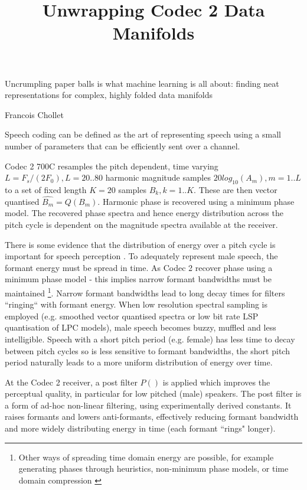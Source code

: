 \documentclass{article}
\begin{document}
\title{Unwrapping Codec 2 Data Manifolds}
\maketitle

\epigraph{Uncrumpling paper balls is what machine learning is all about: finding neat representations for complex, highly folded data manifolds}{Francois Chollet \cite{chollet2018deep}}

Speech coding can be defined as the art of representing speech using a small number of parameters that can be efficiently sent over a channel.

Codec 2 700C resamples the pitch dependent, time varying $L=F_s/(2F_0), L=20..80$ harmonic magnitude samples $20log_{10}(A_m), m=1..L$ to a set of fixed length $K=20$ samples $B_k,k=1..K$.  These are then vector quantised $\hat{B_m}=Q(B_m)$.  Harmonic phase is recovered using a minimum phase model. The recovered phase spectra and hence energy distribution across the pitch cycle is dependent on the magnitude spectra available at the receiver.

There is some evidence that the distribution of energy over a pitch cycle is important for speech perception \cite{rowe2023_ratek_study}. To adequately represent male speech, the formant energy must be spread in time.  As Codec 2 recover phase using a minimum phase model - this implies narrow formant bandwidths must be maintained \footnote{Other ways of spreading time domain energy are possible, for example generating phases through heuristics, non-minimum phase models, or time domain compression \cite{rowe2023_ratek_study}}.  Narrow formant bandwidths lead to long decay times for filters ``ringing`` with formant energy. When low resolution spectral sampling is employed (e.g. smoothed vector quantised spectra or low bit rate LSP quantisation of LPC models), male speech becomes buzzy, muffled and less intelligible.  Speech with a short pitch period (e.g. female) has less time to decay between pitch cycles so is less sensitive to formant bandwidths, the short pitch period naturally leads to a more uniform distribution of energy over time.

At the Codec 2 receiver, a post filter $P()$ is applied which improves the perceptual quality, in particular for low pitched (male) speakers. The post filter is a form of ad-hoc non-linear filtering, using experimentally derived constants.  It raises formants and lowers anti-formants, effectively reducing formant bandwidth and more widely distributing energy in time (each formant ``rings" longer).
\end{document}
